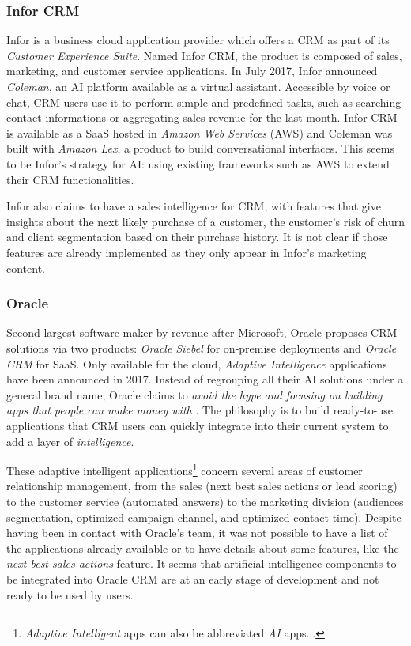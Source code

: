 \subsubsection*{Infor CRM}
Infor is a business cloud application provider which offers a CRM as part of its \textit{Customer Experience Suite}. Named Infor CRM, the product is composed of sales, marketing, and customer service applications. In July 2017, Infor announced \textit{Coleman}, an AI platform available as a virtual assistant. Accessible by voice or chat, CRM users use it to perform simple and predefined tasks, such as searching contact informations or aggregating sales revenue for the last month. Infor CRM is available as a SaaS hosted in \textit{Amazon Web Services} (AWS) and Coleman was built with \textit{Amazon Lex}, a product to build conversational interfaces. This seems to be Infor's strategy for AI: using existing frameworks such as AWS to extend their CRM functionalities.

Infor also claims to have a sales intelligence for CRM, with features that give insights about the next likely purchase of a customer, the customer's risk of churn and client segmentation based on their purchase history. It is not clear if those features are already implemented as they only appear in Infor's marketing content.\nocite{infor-website}


\subsubsection*{Oracle}
Second-largest software maker by revenue after Microsoft, Oracle proposes CRM solutions via two products: \textit{Oracle Siebel} for on-premise deployments and \textit{Oracle CRM} for SaaS. Only available for the cloud, \textit{Adaptive Intelligence} applications have been announced in 2017. Instead of regrouping all their AI solutions under a general brand name, Oracle claims to \textit{avoid the hype and focusing on building apps that people can make money with }\cite{crm-techmerge}. The philosophy is to build ready-to-use applications that CRM users can quickly integrate into their current system to add a layer of \textit{intelligence}.

These adaptive intelligent applications\footnote{\textit{Adaptive Intelligent} apps can also be abbreviated \textit{AI} apps...} concern several areas of customer relationship management, from the sales (next best sales actions or lead scoring) to the customer service (automated answers) to the marketing division (audiences segmentation, optimized campaign channel, and optimized contact time). Despite having been in contact with Oracle's team, it was not possible to have a list of the applications already available or to have details about some features, like the \textit{next best sales actions} feature. It seems that artificial intelligence components to be integrated into Oracle CRM are at an early stage of development and not ready to be used by users. 


